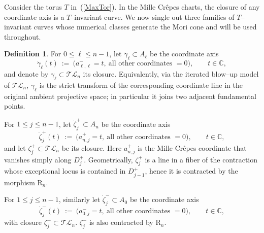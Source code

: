 \documentclass[10pt]{amsart}
\theoremstyle{definition}
\newtheorem{definition}[theorem]{Definition}
\newcommand{\C}{\mathbb{C}}
\newcommand{\TL}{\mathcal{TL}}
\newcommand{\RL}{\mathrm{R}}
\theoremstyle{plain} %
\begin{document}

Consider the torus $T$ in~(\ref{MaxTor}). In the Mille Cr\^epes charts, the closure of any coordinate axis is a $T$--invariant curve. We now single out three families of $T$--invariant curves
whose numerical classes generate the Mori cone and will be used throughout.

\begin{definition}\label{def:T-curves-correct}
For $0\le \ell\le n-1$, let $\dot\gamma_\ell\subset A_\ell$ be the
coordinate axis
\[
\dot\gamma_\ell(t)\ :=\ \bigl(a^-_{\ell,\ell}=t,\ \text{all other coordinates }=0\bigr),
\qquad t\in\C,
\]
and denote by $\gamma_\ell\subset \TL_n$ its closure. Equivalently, via the iterated blow--up model of $\TL_n$, $\gamma_\ell$ is the
strict transform of the corresponding coordinate line in the original ambient
projective space; in particular it joins two adjacent fundamental points.

For $1\le j\le n-1$, let $\dot\zeta_j^+\subset A_n$ be the coordinate axis 
\[ \dot\zeta_j^+(t)\ :=\ \bigl(a^+_{n,j}=t,\ \text{all other coordinates }=0\bigr), \qquad t\in\C, \]
and let $\zeta_j^+\subset \TL_n$ be its closure. Here $a^+_{n,j}$ is the Mille Crêpes coordinate that vanishes simply along $D_j^+$. Geometrically, $\zeta_j^+$ is a line in a fiber of the contraction whose exceptional locus is contained in $D_{j-1}^+$, hence it is contracted by the morphism $\RL_n$.



For $1\le j\le n-1$, similarly let $\dot\zeta_j^-\subset A_0$ be the
coordinate axis \[\dot\zeta_j^-(t)\ :=\ \bigl(a^-_{0,j}=t,\ \text{all other coordinates }=0\bigr), \qquad t\in\C,\] with closure $\zeta_j^-\subset \TL_n$. %
$\zeta_j^-$ is %
also contracted by $\RL_n$.
\end{definition}
\end{document}
